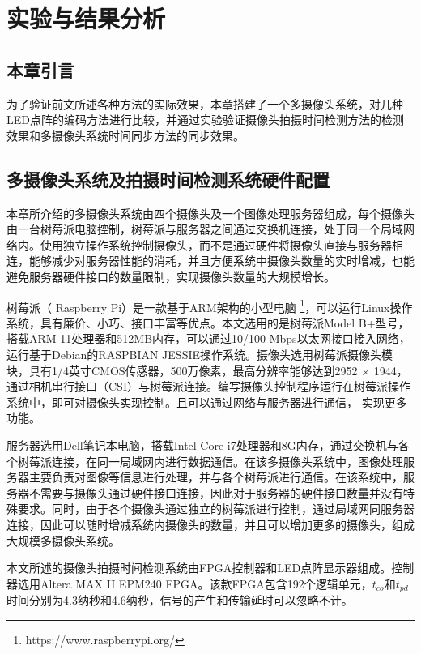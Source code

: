 \chapter{实验与结果分析}

\section{本章引言}

为了验证前文所述各种方法的实际效果，本章搭建了一个多摄像头系统，对几种LED点阵的编码方法进行比较，并通过实验验证摄像头拍摄时间检测方法的检测效果和多摄像头系统时间同步方法的同步效果。

\section{多摄像头系统及拍摄时间检测系统硬件配置}

本章所介绍的多摄像头系统由四个摄像头及一个图像处理服务器组成，每个摄像头由一台树莓派电脑控制，树莓派与服务器之间通过交换机连接，处于同一个局域网络内。使用独立操作系统控制摄像头，而不是通过硬件将摄像头直接与服务器相连，能够减少对服务器性能的消耗，并且方便系统中摄像头数量的实时增减，也能避免服务器硬件接口的数量限制，实现摄像头数量的大规模增长。

树莓派（ Raspberry Pi）是一款基于ARM架构的小型电脑 \footnote{https://www.raspberrypi.org/}，可以运行Linux操作系统，具有廉价、小巧、接口丰富等优点。本文选用的是树莓派Model B+型号，搭载ARM 11处理器和512MB内存，可以通过10/100 Mbps以太网接口接入网络，运行基于Debian的RASPBIAN JESSIE操作系统。摄像头选用树莓派摄像头模块，具有1/4英寸CMOS传感器，500万像素，最高分辨率能够达到2952 × 1944，通过相机串行接口（CSI）与树莓派连接。编写摄像头控制程序运行在树莓派操作系统中，即可对摄像头实现控制。且可以通过网络与服务器进行通信， 实现更多功能。

服务器选用Dell笔记本电脑，搭载Intel Core i7处理器和8G内存，通过交换机与各个树莓派连接，在同一局域网内进行数据通信。在该多摄像头系统中，图像处理服务器主要负责对图像等信息进行处理，并与各个树莓派进行通信。在该系统中，服务器不需要与摄像头通过硬件接口连接，因此对于服务器的硬件接口数量并没有特殊要求。同时，由于各个摄像头通过独立的树莓派进行控制，通过局域网同服务器连接，因此可以随时增减系统内摄像头的数量，并且可以增加更多的摄像头，组成大规模多摄像头系统。

本文所述的摄像头拍摄时间检测系统由FPGA控制器和LED点阵显示器组成。控制器选用Altera MAX II EPM240 FPGA。该款FPGA包含192个逻辑单元，$t_{co}$和$t_{pd}$时间分别为4.3纳秒和4.6纳秒，信号的产生和传输延时可以忽略不计。

